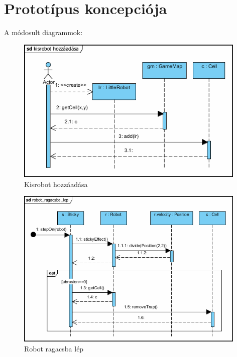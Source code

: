 %


\chapter{Prototípus koncepciója}

A módosult diagrammok:

\begin{figure}[h]
	\begin{center}
		\includegraphics[width=11cm]{chapters/chapter01/kisrobot_hozzaadasa.png}
		\caption{Kisrobot hozzáadása}
		\label{fig:SzkeletonUseCase}
	\end{center}
\end{figure}


\begin{figure}[h]
	\begin{center}
		\includegraphics[width=11cm]{chapters/chapter01/robot_ragacsba_lep.png}
		\caption{Robot ragacsba lép}
		\label{fig:SzkeletonUseCase}
	\end{center}
\end{figure}

